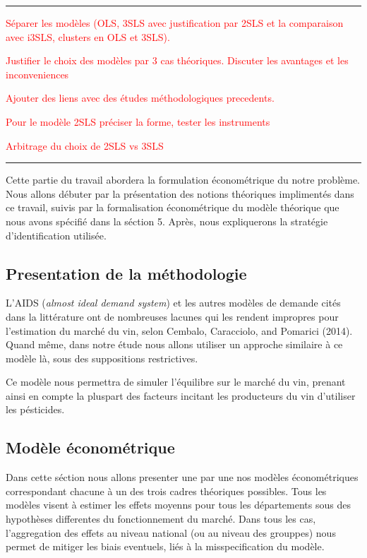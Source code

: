 \documentclass[11pt,]{article}
\begin{document}
\rule[0.5ex]{\linewidth}{1pt}

\textcolor{red}{Séparer les modèles (OLS, 3SLS avec justification par 2SLS et la comparaison avec i3SLS, clusters en OLS et 3SLS).}

\textcolor{red}{Justifier le choix des modèles par 3 cas théoriques. Discuter les avantages et les inconveniences}

\textcolor{red}{Ajouter des liens avec des études méthodologiques precedents.}

\textcolor{red}{Pour le modèle 2SLS préciser la forme, tester les instruments}

\textcolor{red}{Arbitrage du choix de 2SLS vs 3SLS}

\noindent

\rule[0.5ex]{\linewidth}{1pt}

Cette partie du travail abordera la formulation économétrique du notre
problème. Nous allons débuter par la présentation des notions théoriques
implimentés dans ce travail, suivis par la formalisation économétrique
du modèle théorique que nous avons spécifié dans la séction 5. Après,
nous expliquerons la stratégie d'identification utilisée.

\hypertarget{presentation-de-la-methodologie}{%
\subsection{Presentation de la
méthodologie}\label{presentation-de-la-methodologie}}

L'AIDS (\emph{almost ideal demand system}) et les autres modèles de
demande cités dans la littérature ont de nombreuses lacunes qui les
rendent impropres pour l'estimation du marché du vin, selon Cembalo,
Caracciolo, and Pomarici (2014). Quand même, dans notre étude nous
allons utiliser un approche similaire à ce modèle là, sous des
suppositions restrictives.

Ce modèle nous permettra de simuler l'équilibre sur le marché du vin,
prenant ainsi en compte la pluspart des facteurs incitant les
producteurs du vin d'utiliser les pésticides.

\hypertarget{modele-econometrique}{%
\subsection{Modèle économétrique}\label{modele-econometrique}}

Dans cette séction nous allons presenter une par une nos modèles
économétriques correspondant chacune à un des trois cadres théoriques
possibles. Tous les modèles visent à estimer les effets moyenns pour
tous les départements sous des hypothèses differentes du fonctionnement
du marché. Dans tous les cas, l'aggregation des effets au niveau
national (ou au niveau des grouppes) nous permet de mitiger les biais
eventuels, liés à la misspecification du modèle.
\end{document}
